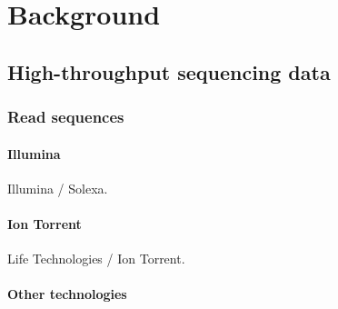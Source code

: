 
\chapter{Background}
\label{chr:background}


\section{High-throughput sequencing data}
\label{sec:background:sequencing}


\subsection{Read sequences}

\subsubsection{Illumina}
Illumina / Solexa.

\subsubsection{Ion Torrent}
Life Technologies / Ion Torrent.

\subsubsection{Other technologies}

